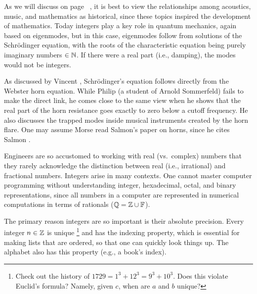 \documentclass{ximera}
\begin{document}
As we will discuss on page ~\pageref{Lec 10},
it is best to view the relationships among acoustics, music, and mathematics as historical, since these
topics inspired the development of mathematics.  Today integers play a key role in quantum mechanics,
again based on eigenmodes, but in this case, eigenmodes follow from solutions of the Schr\"odinger equation,
with the roots of the characteristic equation being purely imaginary numbers $\in\mathbb{N}$.  If there were a real part (i.e.,
damping), the modes would not be integers. 

 { %
As discussed by Vincent \citet[p.~201]{Salmon46a}, Schr\"odinger's equation follows directly from the Webster
horn equation. While Philip \citet[p.~281]{Morse48} (a student of Arnold Sommerfeld) fails to make the direct link, he comes close to the same
view when he shows that the real part of the horn resistance goes exactly to zero below a cutoff frequency.
He also discusses the trapped modes inside musical instruments created by the horn flare.
One may assume Morse read Salmon's paper on horns, since he cites Salmon
 \citep[footnote 1, p.~271]{Morse48}.
 }

Engineers are so accustomed to working with real (vs.~complex) numbers that they rarely acknowledge the distinction between real
(i.e.,  irrational) and fractional numbers.  Integers arise in many
contexts.  One cannot master computer programming without understanding integer, hexadecimal, octal, and
binary representations, since all numbers in a computer are represented in numerical computations in
terms of rationals ($\mathbb{Q} = \mathbb{Z}\cup \mathbb{F}$).

The primary reason integers are so important is their absolute precision.  Every integer $n\in \mathbb{Z}$ is unique%
 \footnote{Check out the history of $1729 = 1^3+ 12^3 = 9^3 + 10^3$.
 Does this violate Euclid's formula? \red Namely, given $c$, when are $a$ and $b$ unique?
 	}
and has the indexing property, which is essential for making lists that are ordered, so that
one can quickly look things up.  The alphabet also has this property (e.g., a book's index).
\end{document}
